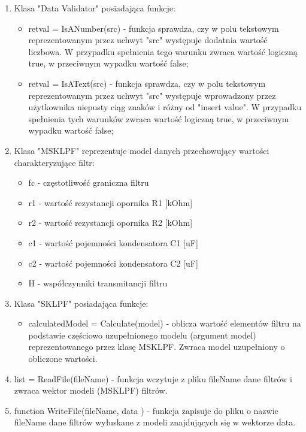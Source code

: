 \documentclass[a4paper,12pt]{article}
\begin{document}
	\begin{enumerate}
		\item Klasa "Data Validator" posiadająca funkcje:
		\begin{itemize}
			\item retval = IsANumber(src) - funkcja sprawdza, czy w polu tekstowym 
			reprezentowanym przez uchwyt "src" występuje dodatnia wartość liczbowa.
			W przypadku spełnienia tego warunku zwraca wartość logiczną true, w przeciwnym
			wypadku wartość false;
			\item retval = IsAText(src) - funkcja sprawdza, czy w polu tekstowym 
			reprezentowanym przez uchwyt "src" występuje wprowadzony przez użytkownika
			niepusty ciąg znaków i różny od "insert value". W przypadku spełnienia tych
			warunków zwraca wartość logiczną true, w przeciwnym
			wypadku wartość false;
		\end{itemize}
		
		\item Klasa "MSKLPF" reprezentuje model danych przechowujący wartości 
		charakteryzujące filtr:
			\begin{itemize}
				\item fc - częstotliwość graniczna filtru
				\item r1 - wartość rezystancji opornika R1 [kOhm]
				\item r2 - wartość rezystancji opornika R2 [kOhm]
				\item c1 - wartość pojemności kondensatora C1 [uF]
				\item c2 - wartość pojemności kondensatora C2 [uF]
				\item H - współczynniki transmitancji filtru
			\end{itemize}
		
		\item Klasa "SKLPF" posiadająca funkcje:
		\begin{itemize}
			\item calculatedModel = Calculate(model) - oblicza wartość elementów
			filtru na podstawie częściowo uzupełnionego modelu (argument model) 
			reprezentowanego przez klasę MSKLPF. Zwraca model uzupełniony o
			obliczone wartości.
		\end{itemize}
		
		\item list = ReadFile(fileName) - funkcja wczytuje z pliku fileName dane 
		filtrów i zwraca wektor modeli (MSKLPF) filtrów.
		
		\item function WriteFile(fileName, data ) - funkcja zapisuje do pliku o nazwie
		fileName dane filtrów wyłuskane z modeli znajdujących się w wektorze data.
		
	\end{enumerate}
\end{document}
